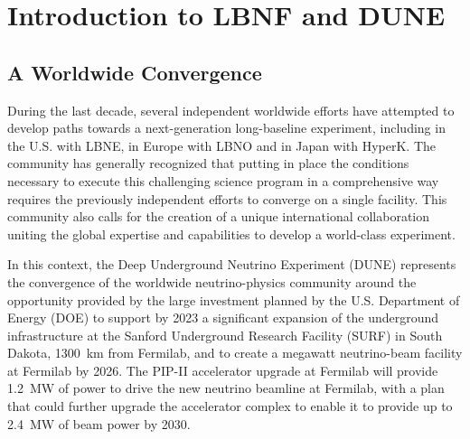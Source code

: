 

\chapter{Introduction to LBNF and DUNE}
\label{ch:project-overview}

%
%

\section{A Worldwide Convergence}

During the last decade, several independent worldwide efforts have attempted to develop paths towards a next-generation long-baseline experiment, including in the U.S. with LBNE, in Europe with LBNO and in Japan with HyperK.  The community has %
generally recognized that putting in place %
the conditions necessary to 
execute this challenging science program in a comprehensive way requires the previously independent 
efforts to converge on a single facility. This community %
also calls for the creation of a unique international collaboration uniting %
the global expertise and capabilities  to develop a world-class experiment.

In this context, the Deep Underground Neutrino Experiment (DUNE) represents the convergence of the worldwide neutrino-physics community around the opportunity provided by the large investment planned by the U.S. Department of Energy (DOE) to support by 2023 a significant expansion of the underground infrastructure at the Sanford Underground Research Facility (SURF) in South Dakota, \SI{1300}{\km} from Fermilab, and to create a megawatt neutrino-beam facility at Fermilab by 2026.  The PIP-II accelerator upgrade at Fermilab will provide \SI{1.2}{\MW} of power to drive the new neutrino beamline at Fermilab, with a plan that could further upgrade the 
accelerator complex to enable it to provide up to \SI{2.4}{\MW} of beam power by 2030.  

